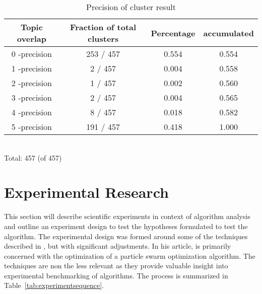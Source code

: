 \begin{table}[htdp]
\footnotesize

\begin{center}
\begin{tabular}{|c|c|c|c|}
\hline
Topic overlap &  Fraction of total clusters & Percentage  & accumulated\\ 
\hline
0 -precision & 253 / 457 & 0.554 & 0.554 \\
1 -precision & 2 / 457 & 0.004 & 0.558 \\
2 -precision & 1 / 457 & 0.002 & 0.560\\
3 -precision & 2 / 457 & 0.004 & 0.565\\
4 -precision & 8 / 457 & 0.018 & 0.582\\
5 -precision & 191 / 457 & 0.418 & 1.000\\
\hline
\end{tabular}
\\Total: 457 (of  457)
\end{center}
\caption{Precision of cluster result}
\label{tab:clusterprecision}
\end{table}


\section{Experimental Research}
\label{ExperimentalResearch}

This section will describe scientific experiments in context of algorithm analysis and outline an experiment design to test the hypotheses formulated to test the \CTC algorithm. The experimental design was formed around some of the techniques described in \cite{Bartz-Beielstein2004}, but with significant adjustments. In his article, \citeauthor{Bartz-Beielstein2004} is primarily concerned with the optimization of a particle swarm optimization algorithm. The techniques are non the less relevant as they provide valuable insight into experimental benchmarking of algorithms. The process is summarized in Table~\ref{tab:experimentsequence}.

